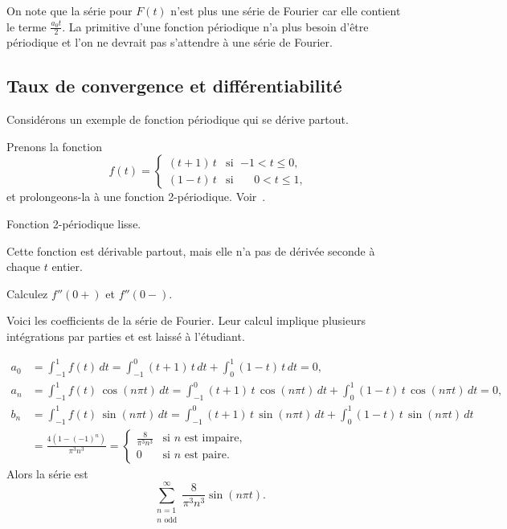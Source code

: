 On note que la série pour $F(t)$ n'est plus une série de Fourier car elle contient le terme
 $\frac{a_0 t}{2}$.  La primitive d'une fonction périodique n'a plus besoin d'être périodique et l'on ne devrait pas
s'attendre à une série de Fourier.

\subsection{Taux de convergence et différentiabilité}

Considérons un exemple de fonction périodique qui se dérive partout.

\begin{example}
Prenons la fonction
\begin{equation*}
f(t) =
\begin{cases}
(t+1)\,t & \text{si } \; {-1} < t \leq 0 , \\
(1-t)\,t & \text{si } \; \phantom{-}0 < t \leq 1 ,
\end{cases}
\end{equation*}
et prolongeons-la à une fonction 
2-périodique.  Voir~.

\begin{myfig}
\capstart
{}
\caption{Fonction 2-périodique lisse.\label{gfs:smoothexfig}}
\end{myfig}

Cette fonction est dérivable partout, mais elle
n'a pas de dérivée seconde à chaque $t$ entier.

\begin{exercise}
Calculez  $f''(0+)$ et $f''(0-)$.
\end{exercise}

Voici les coefficients de la série de Fourier.  Leur calcul 
implique plusieurs intégrations par parties et est laissé à l'étudiant.

\begin{align*}
a_0 & = 
\int_{-1}^1
f(t) \, dt = 
\int_{-1}^0
(t+1)\,t \, dt +
\int_0^1
(1-t)\,t \, dt = 0 , \\
a_n & = 
\int_{-1}^1
f(t) \, \cos (n\pi t) \, dt = 
\int_{-1}^0
(t+1)\,t
\, \cos (n \pi t) \, dt +
\int_0^1
(1-t)\,t
\, \cos (n \pi t) \, dt = 0, \\
b_n & = 
\int_{-1}^1
f(t) \, \sin (n\pi t) \, dt = 
\int_{-1}^0
(t+1)\,t
\, \sin (n \pi t) \, dt +
\int_0^1
(1-t)\,t
\, \sin (n \pi t) \, dt \\
& =
\frac{4 ( 1-{(-1)}^n)}{\pi^3 n^3} 
=
\begin{cases}
\frac{8}{\pi^3 n^3} & \text{si } n \text{ est impaire} , \\
0 & \text{si } n \text{ est paire} .
\end{cases}
\end{align*}
Alors la série est 
\begin{equation*}
\sum_{\substack{n=1 \\ n \text{ odd}}}^\infty \frac{8}{\pi^3 n^3} \sin (n \pi t) .
\end{equation*}


\end{example}
